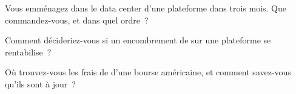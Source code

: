\begin{interviewq}\label{iq:nw:colocation-products-and-how-they-are-sold:4}
Vous emménagez dans le data center d'une plateforme dans trois mois. Que commandez-vous, et dans quel ordre~?
\end{interviewq}

\begin{interviewq}\label{iq:nw:colocation-products-and-how-they-are-sold:5}
Comment décideriez-vous si un encombrement de  sur une plateforme se rentabilise~?
\end{interviewq}

\begin{interviewq}\label{iq:nw:colocation-products-and-how-they-are-sold:6}
Où trouvez-vous les frais de  d'une bourse américaine, et comment savez-vous qu'ils sont à jour~?
\end{interviewq}
